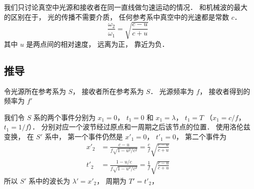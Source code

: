 

我们只讨论真空中光源和接收者在同一直线做匀速运动的情况． 和机械波的最大的区别在于， 光的传播不需要介质， 任何参考系中真空中的光速都是常数 $c$． %
\begin{equation}
\frac{\omega_2}{\omega_1} = \sqrt{\frac{c - u}{c + u}}
\end{equation}
其中 $u$ 是两点间的相对速度， 远离为正， 靠近为负．

\subsection{推导}
令光源所在参考系为 $S$， 接收者所在参考系为 $S$． 光源频率为 $f$， 接收者得到的频率为 $f'$

我们令 $S$ 系的两个事件分别为 $x_1 = 0$， $t_1 = 0$ 和 $x_1 = \lambda$， $t_1 = T$ （$x_1 = c/f$， $t_1 = 1/f$）． 分别对应一个波节经过原点和一周期之后该节点的位置． 使用洛伦兹变换， 在 $S'$ 系中， 第一个事件仍然是 $x'_1 = 0$， $t'_1 = 0$， 第二个事件为
\begin{equation}
\begin{aligned}
x'_2 &= \frac{c - u}{f\sqrt{1 - u^2/c^2}} = \frac{c}{f}\sqrt{\frac{c - u}{c + u}} \\
t'_2 &= \frac{1 - u/c}{f\sqrt{1 - u^2/c^2}} = \frac{1}{f}\sqrt{\frac{c - u}{c + u}}
\end{aligned}
\end{equation}
所以 $S'$ 系中的波长为 $\lambda' = x'_2$， 周期为 $T' = t'_2$，

